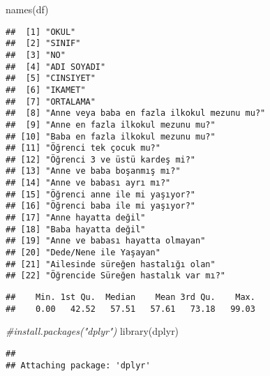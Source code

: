 \documentclass[
]{article}
\newenvironment{Shaded}{\begin{snugshade}}{\end{snugshade}}
\newcommand{\CommentTok}[1]{\textcolor[rgb]{0.56,0.35,0.01}{\textit{#1}}}
\newcommand{\FunctionTok}[1]{\textcolor[rgb]{0.00,0.00,0.00}{#1}}
\newcommand{\NormalTok}[1]{#1}
\newcommand{\SpecialCharTok}[1]{\textcolor[rgb]{0.00,0.00,0.00}{#1}}
\begin{document}
\begin{Shaded}
\begin{Highlighting}[]
\FunctionTok{names}\NormalTok{(df)}
\end{Highlighting}
\end{Shaded}

\begin{verbatim}
##  [1] "OKUL"                                      
##  [2] "SINIF"                                     
##  [3] "NO"                                        
##  [4] "ADI SOYADI"                                
##  [5] "CINSIYET"                                  
##  [6] "IKAMET"                                    
##  [7] "ORTALAMA"                                  
##  [8] "Anne veya baba en fazla ilkokul mezunu mu?"
##  [9] "Anne en fazla ilkokul mezunu mu?"          
## [10] "Baba en fazla ilkokul mezunu mu?"          
## [11] "Öğrenci tek çocuk mu?"                     
## [12] "Öğrenci 3 ve üstü kardeş mi?"              
## [13] "Anne ve baba boşanmış mı?"                 
## [14] "Anne ve babası ayrı mı?"                   
## [15] "Öğrenci anne ile mi yaşıyor?"              
## [16] "Öğrenci baba ile mi yaşıyor?"              
## [17] "Anne hayatta değil"                        
## [18] "Baba hayatta değil"                        
## [19] "Anne ve babası hayatta olmayan"            
## [20] "Dede/Nene ile Yaşayan"                     
## [21] "Ailesinde süreğen hastalığı olan"          
## [22] "Öğrencide Süreğen hastalık var mı?"
\end{verbatim}

\begin{Shaded}
\end{Shaded}

\begin{verbatim}
##    Min. 1st Qu.  Median    Mean 3rd Qu.    Max. 
##    0.00   42.52   57.51   57.61   73.18   99.03
\end{verbatim}

\begin{Shaded}
\begin{Highlighting}[]
\CommentTok{\#install.packages("dplyr")}
\FunctionTok{library}\NormalTok{(dplyr)}
\end{Highlighting}
\end{Shaded}

\begin{verbatim}
## 
## Attaching package: 'dplyr'
\end{verbatim}
\end{document}
